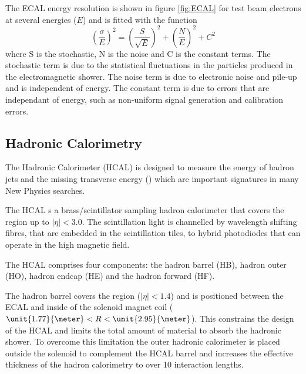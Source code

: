 The ECAL energy resolution is shown in figure \ref{fig:ECAL} for test beam
electrons at several energies ($E$) and is fitted with the function
\begin{equation}
\left(\frac{\sigma}{E}\right)^{2} = \left(\frac{S}{\sqrt{E}}\right)^{2} +
\left(\frac{N}{E}\right)^{2} + C^{2}
\end{equation}
where S is the stochastic, N is the noise and C is the constant terms. The
stochastic term is due to the statistical fluctuations in the particles
produced in the electromagnetic shower. The noise term is due to electronic
noise and pile-up and is independent of energy. The constant term is due to
errors that are independant of energy, such as non-uniform signal generation
and calibration errors.\cite{cms}




\subsection{Hadronic Calorimetry}

The Hadronic Calorimeter (HCAL) is designed to measure the energy of
hadron jets and the missing transverse energy (\met) which are important
signatures in many New Physics searches.

The HCAL s a brass/scintillator sampling hadron calorimeter that covers the
region up to $|\eta|<3.0$.
The scintillation light is channelled by wavelength shifting fibres, that are
embedded in the scintillation tiles, to hybrid photodiodes that can operate in
the high magnetic field. \cite{cms}

The HCAL comprises four components: the hadron barrel (HB), hadron outer (HO),
hadron endcap (HE) and the hadron forward (HF).

The hadron barrel covers the region ($|\eta| < 1.4$) and is positioned between
the ECAL and inside of the solenoid magnet coil
($\unit{1.77}{\meter}<R<\unit{2.95}{\meter}$).
This constrains the design of the HCAL and limits the total amount of material
to absorb the hadronic shower. 
To overcome this limitation the outer hadronic calorimeter is
placed outside the solenoid to complement the HCAL barrel and increases the
effective thickness of the hadron calorimetry to over 10 interaction lengths.

